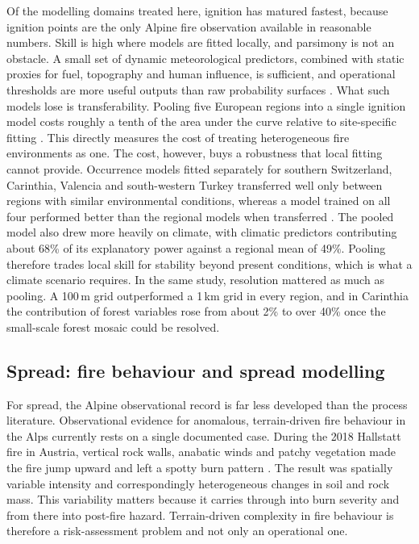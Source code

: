 \documentclass[11pt,a4paper]{article}
\begin{document}
Of the modelling domains treated here, ignition has matured fastest, because ignition points are the only Alpine fire observation available in reasonable numbers. Skill is high where models are fitted locally, and parsimony is not an obstacle. A small set of dynamic meteorological predictors, combined with static proxies for fuel, topography and human influence, is sufficient, and operational thresholds are more useful outputs than raw probability surfaces \citep{moreno_1_nodate, vacchiano_modeling_2018, arndt_modeling_2013}. What such models lose is transferability. Pooling five European regions into a single ignition model costs roughly a tenth of the area under the curve relative to site-specific fitting \citep{gelabert_assessing_2025}. This directly measures the cost of treating heterogeneous fire environments as one. The cost, however, buys a robustness that local fitting cannot provide. Occurrence models fitted separately for southern Switzerland, Carinthia, Valencia and south-western Turkey transferred well only between regions with similar environmental conditions, whereas a model trained on all four performed better than the regional models when transferred \citep{bekar_crossregional_2020}. The pooled model also drew more heavily on climate, with climatic predictors contributing about 68\% of its explanatory power against a regional mean of 49\%. Pooling therefore trades local skill for stability beyond present conditions, which is what a climate scenario requires. In the same study, resolution mattered as much as pooling. A 100\,m grid outperformed a 1\,km grid in every region, and in Carinthia the contribution of forest variables rose from about 2\% to over 40\% once the small-scale forest mosaic could be resolved.

\subsection{Spread: fire behaviour and spread modelling}

For spread, the Alpine observational record is far less developed than the process literature. Observational evidence for anomalous, terrain-driven fire behaviour in the Alps currently rests on a single documented case. During the 2018 Hallstatt fire in Austria, vertical rock walls, anabatic winds and patchy vegetation made the fire jump upward and left a spotty burn pattern \citep{melzner_brief_2019}. The result was spatially variable intensity and correspondingly heterogeneous changes in soil and rock mass. This variability matters because it carries through into burn severity and from there into post-fire hazard. Terrain-driven complexity in fire behaviour is therefore a risk-assessment problem and not only an operational one.
\end{document}
